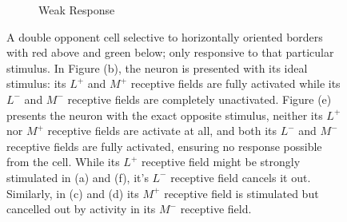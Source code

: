 \documentclass[journal,onecolumn]{IEEEtran}
\begin{document}
{\begin{figure}[H]
\begin{subfigure}{0.15\textwidth}
{
        }
        \caption{Weak Response}
    \end{subfigure}
    \caption{A double opponent cell selective to horizontally oriented borders with red above and green below; only responsive to that particular stimulus. In Figure (b), the neuron is presented with its ideal stimulus: its $L^+$ and $M^+$ receptive fields are fully activated while its $L^-$ and $M^-$ receptive fields are completely unactivated. Figure (e) presents the neuron with the exact opposite stimulus, neither its $L^+$ nor $M^+$ receptive fields are activate at all, and both its $L^-$ and $M^-$ receptive fields are fully activated, ensuring no response possible from the cell. While its $L^+$ receptive field might be strongly stimulated in (a) and (f), it's $L^-$ receptive field cancels it out. Similarly, in (c) and (d) its $M^+$ receptive field is stimulated but cancelled out by activity in its $M^-$ receptive field.}
    \label{fig:do-orient-h}
\end{figure}
\begin{figure}[H]
    \centering
    \begin{subfigure}{0.15\textwidth}
        \centering
\end{subfigure}
\end{figure}}
\end{document}
